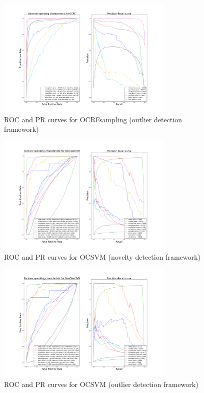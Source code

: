 \begin{figure}[!ht]
    \caption{\acs{ROC} and \acs{PR} curves for \acs{OCRFsampling} (outlier
    detection framework)}
    \label{ocrf:fig:ocrfm_roc_pr_unsupervised}
    \centering
    \includegraphics[trim=175 80 175 123, clip,
    width=0.75\textwidth]{./gfx/bench_ocrf_roc_pr_unsupervised_factorized.png}
\end{figure}
\begin{figure}[!ht]
    \caption{\acs{ROC} and \acs{PR} curves for \acs{OCSVM} (novelty detection
    framework)}
    \label{ocrf:fig:ocsvm_roc_pr}
    \centering
    \includegraphics[trim=175 80 175 123, clip,
    width=0.75\textwidth]{./gfx/bench_ocsvm_roc_pr_supervised_factorized.png}
\end{figure}
\begin{figure}[!ht]
    \caption{\acs{ROC} and \acs{PR} curves for \acs{OCSVM} (outlier detection
    framework)}
    \label{ocrf:fig:ocsvm_roc_pr_unsupervised}
    \centering
    \includegraphics[trim=175 80 175 123, clip,
    width=0.75\textwidth]{./gfx/bench_ocsvm_roc_pr_unsupervised_factorized.png}
\end{figure}
